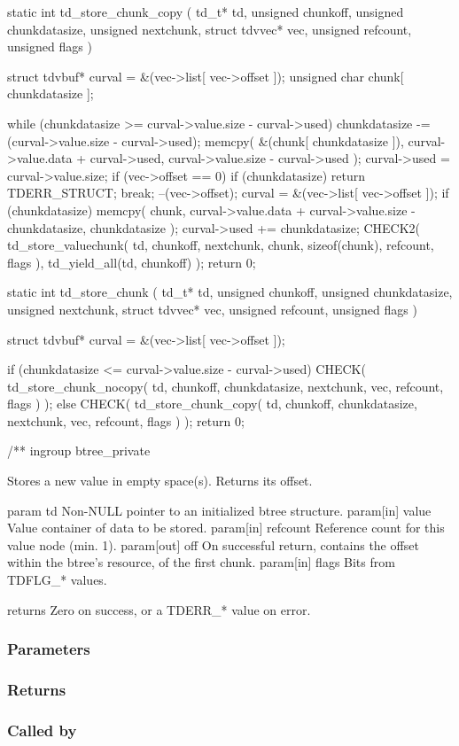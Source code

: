 static
int td\_store\_chunk\_copy
  (
    td\_t*           td,
    unsigned        chunkoff,
    unsigned        chunkdatasize,
    unsigned        nextchunk,
    struct tdvvec*  vec,
    unsigned        refcount,
    unsigned        flags
  )
{
  struct tdvbuf* curval = &(vec->list[ vec->offset ]);
  unsigned char chunk[ chunkdatasize ];

  while (chunkdatasize >= curval->value.size - curval->used) {
    chunkdatasize -= (curval->value.size - curval->used);
    memcpy(
      &(chunk[ chunkdatasize ]),
      curval->value.data + curval->used,
      curval->value.size - curval->used
    );
    curval->used = curval->value.size;
    if (vec->offset == 0) {
      if (chunkdatasize) {
        return TDERR\_STRUCT;
      }
      break;
    }
    --(vec->offset);
    curval = &(vec->list[ vec->offset ]);
  }
  if (chunkdatasize) {
    memcpy(
      chunk,
      curval->value.data + curval->value.size - chunkdatasize,
      chunkdatasize
    );
    curval->used += chunkdatasize;
  }
  CHECK2(
    td\_store\_valuechunk(
      td,
      chunkoff,
      nextchunk,
      chunk,
      sizeof(chunk),
      refcount,
      flags
    ),
    td\_yield\_all(td, chunkoff)
  );
  return 0;
}

static
int td\_store\_chunk
  (
    td\_t*           td,
    unsigned        chunkoff,
    unsigned        chunkdatasize,
    unsigned        nextchunk,
    struct tdvvec*  vec,
    unsigned        refcount,
    unsigned        flags
  )
{
  struct tdvbuf* curval = &(vec->list[ vec->offset ]);

  if (chunkdatasize <= curval->value.size - curval->used) {
    CHECK(
      td\_store\_chunk\_nocopy(
        td, chunkoff, chunkdatasize, nextchunk, vec, refcount, flags
      )
    );
  } else {
    CHECK(
      td\_store\_chunk\_copy(
        td, chunkoff, chunkdatasize, nextchunk, vec, refcount, flags
      )
    );
  }
  return 0;
}

/**
 ingroup btree\_private

 Stores a new value in empty space(s). Returns its offset.

 param td Non-NULL pointer to an initialized btree structure.
 param[in] value Value container of data to be stored.
 param[in] refcount Reference count for this value node (min. 1).
 param[out] off On successful return, contains the offset within
 the btree's resource, of the first chunk.
 param[in] flags Bits from TDFLG\_* values.

 returns Zero on success, or a TDERR\_* value on error.
 

\subsubsection{Parameters}
\subsubsection{Returns}
\subsubsection{Called by}

